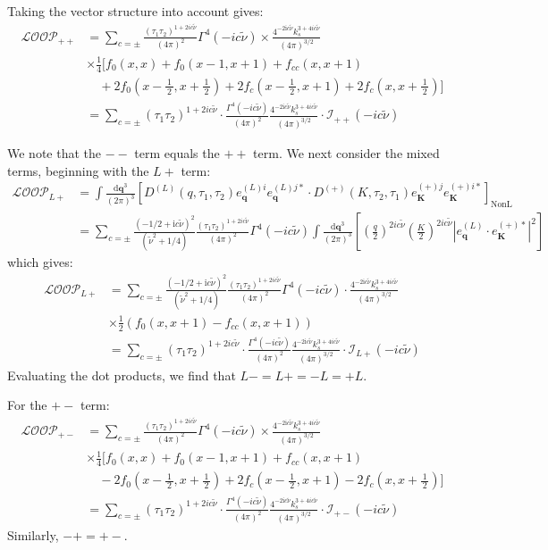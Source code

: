 \documentclass[a4paper,12pt]{article}
\newcommand{\fr}[2]{\mbox{$\frac{\,{#1}\,}{#2}$}}
\def\di{{\mathrm{d}}}
\def\mb{\mathbf}
\def\ii{\mathrm{i}}
\def\tn{\tilde\nu}
\begin{document}
Taking the vector structure into account gives:
\begin{align}
    \mathcal{{LOOP}}_{++}  &= \sum_{c=\pm} \frac{(\tau_1 \tau_2)^{1+2ic\tn}}{(4\pi)^2} \Gamma^4(-ic\tn) \times \frac{4^{-2\ii c\tn} k_s^{3+4ic\tn}}{(4\pi)^{3/2}} \nonumber \\
    &\times \frac{1}{4} [f_0(x,x) + f_0(x-1,x+1) +f_{cc}(x,x+1) \nonumber \\
    &\quad + 2f_0(x-\fr{1}{2},x+\fr{1}{2}) +2f_c(x-\fr{1}{2},x+1) +2f_c(x,x+\fr{1}{2}) ]\\
    &= \sum_{c=\pm}
    (\tau_1 \tau_2)^{1+2ic\tn} \cdot
    \frac{\Gamma^4(-ic\tn)}{(4\pi)^2}
    \frac{4^{-2\ii c\tn} k_s^{3+4ic\tn}}{(4\pi)^{3/2}} 
    \cdot \mathcal{I}_{++}(-ic\tn)
\end{align}

We note that the $--$ term equals the $++$ term.
We next consider the mixed terms, beginning with the $L+$ term:
\begin{align}
    \mathcal{{LOOP}}_{L+} &= \int \frac{\di \mb{q}^3}{(2\pi)^3} \left[ D^{(L)}(q,\tau_1,\tau_2) e^{(L)i}_{\mb q} e^{(L)j*}_{\mb q} \cdot D^{(+)}(K,\tau_2,\tau_1) e^{(+)j}_{\mb K} e^{(+)i*}_{\mb K} \right]_{\text{NonL}} \nonumber \\
    &= \sum_{c=\pm} \frac{(-1/2+\ii c\tn)^2}{(\tilde\nu^2 + 1/4)} \frac{(\tau_1 \tau_2)^{1+2ic\tn}}{(4\pi)^2} \Gamma^4(-ic\tn) \int \frac{\di \mb{q}^3}{(2\pi)^3}\left[  \left( \frac{q}{2} \right)^{2ic\tn} \left( \frac{K}{2} \right)^{2ic\tn} |e^{(L)}_{\mb q} \cdot e^{(+)*}_{\mb K}|^2 \right]
\end{align}
which gives:
\begin{align}
    \mathcal{{LOOP}}_{L+} &= \sum_{c=\pm} \frac{(-1/2+\ii c\tn)^2}{(\tilde\nu^2 + 1/4)} \frac{(\tau_1 \tau_2)^{1+2ic\tn}}{(4\pi)^2} \Gamma^4(-ic\tn) \cdot \frac{4^{-2\ii c\tn} k_s^{3+4ic\tn}}{(4\pi)^{3/2}} \nonumber \\
    &\times \frac{1}{2} \left( f_0(x,x+1) - f_{cc}(x,x+1)  \right) \\
    &= \sum_{c=\pm}
    (\tau_1 \tau_2)^{1+2ic\tn} \cdot
    \frac{\Gamma^4(-ic\tn)}{(4\pi)^2}
    \frac{4^{-2\ii c\tn} k_s^{3+4ic\tn}}{(4\pi)^{3/2}} 
    \cdot \mathcal{I}_{L+}(-ic\tn)
\end{align}
Evaluating the dot products, we find that $L-=L+=-L=+L$.

For the $+-$ term:
\begin{align}
    \mathcal{{LOOP}}_{+-}  &= \sum_{c=\pm} \frac{(\tau_1 \tau_2)^{1+2ic\tn}}{(4\pi)^2} \Gamma^4(-ic\tn) \times \frac{4^{-2\ii c\tn} k_s^{3+4ic\tn}}{(4\pi)^{3/2}} \nonumber \\
    &\times \frac{1}{4} [f_0(x,x) + f_0(x-1,x+1) +f_{cc}(x,x+1) \nonumber \\
    &\quad - 2f_0(x-\fr{1}{2},x+\fr{1}{2}) +2f_c(x-\fr{1}{2},x+1) -2f_c(x,x+\fr{1}{2}) ] \\
    &= \sum_{c=\pm}
    (\tau_1 \tau_2)^{1+2ic\tn} \cdot
    \frac{\Gamma^4(-ic\tn)}{(4\pi)^2}
    \frac{4^{-2\ii c\tn} k_s^{3+4ic\tn}}{(4\pi)^{3/2}} 
    \cdot \mathcal{I}_{+-}(-ic\tn)
\end{align}
Similarly, $-+=+-$.
\end{document}
